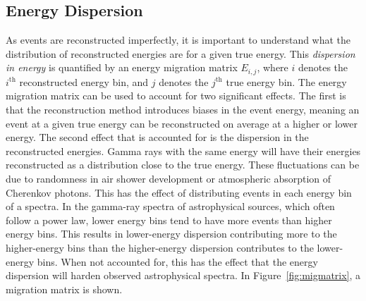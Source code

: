 {  \FloatBarrier

  \subsection{Energy Dispersion}\label{subsec:edisp}
    As events are reconstructed imperfectly, it is important to understand what the distribution of reconstructed energies are for a given true energy.
    This \textit{dispersion in energy} is quantified by an energy migration matrix $E_{i,j}$, where $i$ denotes the $i^{\text{th}}$ reconstructed energy bin, and $j$ denotes the $j^{\text{th}}$ true energy bin.
    The energy migration matrix can be used to account for two significant effects.
    The first is that the reconstruction method introduces biases in the event energy, meaning an event at a given true energy can be reconstructed on average at a higher or lower energy.
    The second effect that is accounted for is the dispersion in the reconstructed energies.
    Gamma rays with the same energy will have their energies reconstructed as a distribution close to the true energy.
    These fluctuations can be due to randomness in air shower development or atmospheric absorption of Cherenkov photons.
    This has the effect of distributing events in each energy bin of a spectra.
    In the gamma-ray spectra of astrophysical sources, which often follow a power law, lower energy bins tend to have more events than higher energy bins.
    This results in lower-energy dispersion contributing more to the higher-energy bins than the higher-energy dispersion contributes to the lower-energy bins.
    When not accounted for, this has the effect that the energy dispersion will harden observed astrophysical spectra.
    In Figure~\ref{fig:migmatrix}, a migration matrix is shown.

}
